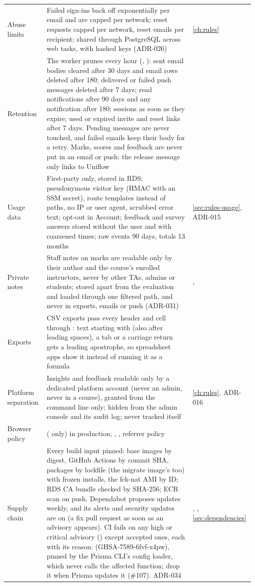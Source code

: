 \begin{xltabular}{\linewidth}{@{}P{30mm} L P{26mm}@{}}
  Abuse limits & Failed sign-ins back off exponentially per email and are capped per network; reset requests capped per network, reset emails per recipient; shared through PostgreSQL across web tasks, with hashed keys (ADR-026) & \cref{ch:rules}\\
  Retention & The worker prunes every hour (, ): sent email bodies cleared after 30 days and email rows deleted after 180; delivered or failed push messages deleted after 7 days; read notifications after 90 days and any notification after 180; sessions as soon as they expire; used or expired invite and reset links after 7 days. Pending messages are never touched, and failed emails keep their body for a retry. Marks, scores and feedback are never put in an email or push: the release message only links to Uniflow & \\
  Usage data & First-party only, stored in RDS; pseudonymous visitor key (HMAC with an SSM secret), route templates instead of paths, no IP or user agent, scrubbed error text; opt-out in Account; feedback and survey answers stored without the user and with coarsened times; raw events 90 days, totals 13 months & \cref{sec:rules-usage}, ADR-015\\
  Private notes & Staff notes on marks are readable only by their author and the course's enrolled instructors, never by other TAs, admins or students; stored apart from the evaluation and loaded through one filtered path, and never in exports, emails or push (ADR-031) & , \\
  Exports & CSV exports pass every header and cell through : text starting with  (also after leading spaces), a tab or a carriage return gets a leading apostrophe, so spreadsheet apps show it instead of running it as a formula & \\
  Platform separation & Insights and feedback readable only by a dedicated platform account (never an admin, never in a course), granted from the command line only; hidden from the admin console and its audit log; never tracked itself & \cref{ch:rules}, ADR-016\\
  Browser policy &  ( only) in production; , , referrer policy & \\
  Supply chain & Every build input pinned: base images by digest, GitHub Actions by commit SHA, packages by lockfile (the migrate image's too) with frozen installs, the fck-nat AMI by ID; RDS CA bundle checked by SHA-256; ECR scan on push. Dependabot proposes updates weekly, and its alerts and security updates are on (a fix pull request as soon as an advisory appears). CI fails on any high or critical advisory () except accepted ones, each with its reason:  (GHSA-7589-6fvf-x4pw), pinned by the Prisma CLI's config loader, which never calls the affected function; drop it when Prisma updates it (\#107). ADR-034 & , , \cref{sec:dependencies}\\

\end{xltabular}
